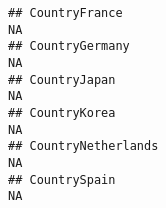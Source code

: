 \documentclass[]{article}
\begin{document}
\begin{verbatim}
## CountryFrance                                                                                                                                                                                                                                                                                                                                                                                                                                                                           NA
## CountryGermany                                                                                                                                                                                                                                                                                                                                                                                                                                                                          NA
## CountryJapan                                                                                                                                                                                                                                                                                                                                                                                                                                                                            NA
## CountryKorea                                                                                                                                                                                                                                                                                                                                                                                                                                                                            NA
## CountryNetherlands                                                                                                                                                                                                                                                                                                                                                                                                                                                                      NA
## CountrySpain                                                                                                                                                                                                                                                                                                                                                                                                                                                                            NA

\end{verbatim}
\end{document}
